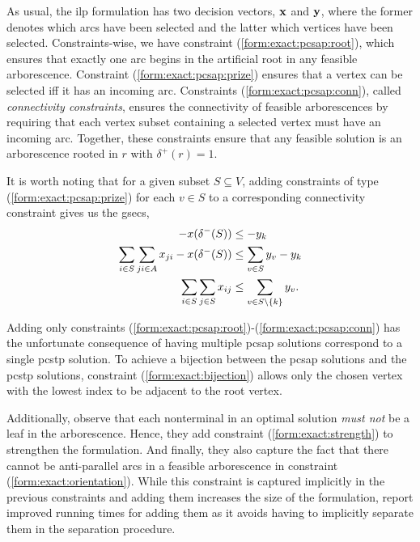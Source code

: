  As usual, the \gls{ilp} formulation has two decision vectors, $\mathbf{x}$ and $\mathbf{y}$, where the former denotes
 which arcs have been selected and the latter which vertices have been selected.
 Constraints-wise,
 we have
 constraint (\ref{form:exact:pcsap:root}), which ensures that exactly one arc begins in the artificial
 root in any feasible arborescence. Constraint (\ref{form:exact:pcsap:prize}) ensures
 that a vertex can be selected iff it has an incoming arc.
 Constraints (\ref{form:exact:pcsap:conn}), called \textit{connectivity constraints},
 ensures the connectivity of feasible arborescences by requiring that
 each vertex subset containing a selected vertex must have an incoming arc.
 Together, these constraints ensure that any feasible solution is an arborescence rooted
 in $r$ with $\delta^+(r) = 1$.

 It is worth noting that for a given subset $S \subseteq V$, adding constraints of type
 (\ref{form:exact:pcsap:prize}) for each $v \in S$ to a corresponding connectivity constraint
  gives us the \glspl{gsec},
 \begin{align*}
   -x(\delta^-(S)) &\leq -y_k \\
   \sum_{i \in S} \sum_{ji \in A} x_{ji} - x (\delta^-(S)) &\leq \sum_{v \in S} y_v - y_k \\
   \sum_{i \in S} \sum_{j \in S} x_{ij} &\leq \sum_{v \in S \setminus \{k\}} y_v \mathnormal{.}
 \end{align*}

 Adding only constraints (\ref{form:exact:pcsap:root})-(\ref{form:exact:pcsap:conn})
 has the unfortunate consequence of having multiple 
 \gls{pcsap} solutions
 correspond
 to a single \gls{pcstp} solution. To achieve a bijection between the \gls{pcsap} solutions and the
 \gls{pcstp} solutions, constraint (\ref{form:exact:bijection}) allows only the chosen vertex
 with the lowest index to be adjacent to the root vertex.
 
 Additionally, \citet{ljubic2005solving} observe that each nonterminal in an optimal solution
 \textit{must not} be a leaf in the arborescence. Hence, they add constraint
 (\ref{form:exact:strength}) to strengthen the formulation. And finally, they
 also capture the fact that there cannot be anti-parallel arcs in a feasible arborescence in
 constraint (\ref{form:exact:orientation}). While this constraint is captured implicitly
 in the previous constraints and adding them increases the size of the formulation,
 \citet{ljubic2005solving} report improved running times for adding them as it avoids
 having to implicitly separate them in the separation procedure.
 
